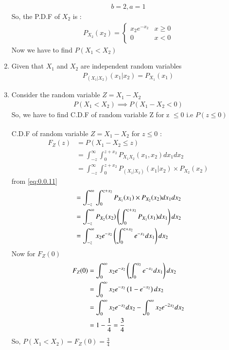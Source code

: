 \documentclass[journal,12pt,twocolumn]{IEEEtran}
\begin{document}
\begin{enumerate}
  \begin{align}
      b=2,a=1
  \end{align}
  So, the P.D.F of $X_2$ is :
  \begin{align}
      P_{X_2}(x_2)=
      \begin{cases}
          x_2e^{-x_2} & x\geq 0 \\
          0 & x<0
      \end{cases}
  \end{align}
  Now we have to find $P(X_1<X_2)$\\
  \item Given that $X_1$ and $X_2$ are independent random variables 
  \begin{align}
      P_{(X_1|X_2)}(x_1|x_2)=P_{X_1}(x_1)\label{eq:0.0.11}
  \end{align}
  \item Consider the random variable $Z=X_1-X_2$\\
  \begin{align}
 P(X_1<X_2)\implies P(X_1-X_2<0)
  \end{align}
  So, we have to find C.D.F of random variable Z for z $\leq 0$ i.e $P(z\leq 0)$\\ 
  \\C.D.F of random variable $Z=X_1-X_2$ for $z\leq 0$ :
\begin{align}
      F_Z(z) &=P(X_1-X_2 \leq z)\\
       &=\int_{-z}^\infty \int_{0}^{z+x_2}P_{X_1X_2}(x_1,x_2) dx_1 dx_2\\
       &=\int_{-z}^\infty \int_{0}^{z+x_2}P_{(X_1|X_2)}(x_1|x_2)\times P_{X_2}(x_2)
       \end{align}
       from \eqref{eq:0.0.11}
       \begin{align}
       &=\int_{-z}^\infty \int_{0}^{z+x_2}P_{X_1}(x_1)\times P_{X_2}(x_2) dx_1dx_2\\
       &=\int_{-z}^\infty P_{X_2}(x_2)\left( \int_{0}^{z+x_2}P_{X_1}(x_1) dx_1\right) dx_2\\
       &=\int_{-z}^\infty x_2 e^{-x_2} \left(\int_{0}^{z+x_2}e^{-x_1}dx_1\right)dx_2
  \end{align}
  Now for $F_Z(0)$
  \begin{align}
  \begin{split}
      F_Z(0)&=\int_{0}^\infty x_2 e^{-x_2} \left(\int_{0}^{x_2}e^{-x_1}dx_1\right)dx_2\\
      &=\int_{0}^\infty x_2 e^{-x_2} \left(1-e^{-x_2}\right)dx_2\\
      &=\int_{0}^\infty x_2 e^{-x_2}dx_2-\int_{0}^\infty x_2e^{-2x_2} dx_2\\
      &=1-\frac{1}{4}=\frac{3}{4}
      \end{split}
  \end{align}
  So, $P(X_1<X_2)=F_Z(0)=\frac{3}{4}$
\end{enumerate}
\end{document}
